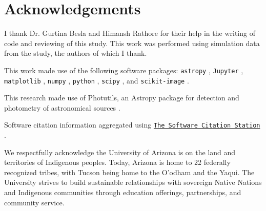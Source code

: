 \documentclass[fleqn,usenatbib]{mnras}
\begin{document}
\section*{Acknowledgements}
I thank Dr. Gurtina Besla and Himansh Rathore for their help in the writing of code and reviewing of this study. This work was performed using simulation data from the \citet{van_der_Marel_2012} study, the authors of which I thank.

This work made use of the following software packages: \texttt{astropy} \citep{astropy:2013, astropy:2018, astropy:2022}, \texttt{Jupyter} \citep{2007CSE.....9c..21P, kluyver2016jupyter}, \texttt{matplotlib} \citep{Hunter:2007}, \texttt{numpy} \citep{numpy}, \texttt{python} \citep{python}, \texttt{scipy} \citep{2020SciPy-NMeth, scipy_14880408}, and \texttt{scikit-image} \citep{scikit-image}.

This research made use of Photutils, an Astropy package for detection and photometry of astronomical sources \citep{Photutils_14889440}.

Software citation information aggregated using \texttt{\href{https://www.tomwagg.com/software-citation-station/}{The Software Citation Station}} \citep{software-citation-station-paper, software-citation-station-zenodo}.

We respectfully acknowledge the University of Arizona is on the land and territories of Indigenous peoples. Today, Arizona is home to 22 federally recognized tribes, with Tucson being home to the O’odham and the Yaqui. The University strives to build sustainable relationships with sovereign Native Nations and Indigenous communities through education offerings, partnerships, and community service.











\bsp	%
\label{lastpage}
\end{document}

